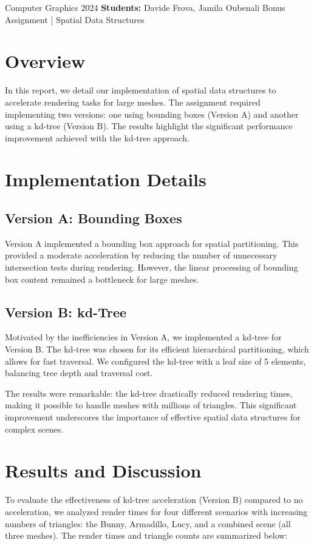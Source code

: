 \documentclass[unicode,11pt,a4paper,oneside,numbers=endperiod,openany]{scrartcl}
\begin{document}
\setassignment

\serieheader
{Computer Graphics}
{2024}
{\textbf{Students:} Davide Frova, Jamila Oubenali}
{}
{Bonus Assignment | Spatial Data Structures}{}

\section{Overview}
In this report, we detail our implementation of spatial data structures to accelerate rendering tasks for large meshes. The assignment required implementing two versions: one using bounding boxes (Version A) and another using a kd-tree (Version B). The results highlight the significant performance improvement achieved with the kd-tree approach.

\section{Implementation Details}

\subsection{Version A: Bounding Boxes}
Version A implemented a bounding box approach for spatial partitioning. This provided a moderate acceleration by reducing the number of unnecessary intersection tests during rendering. However, the linear processing of bounding box content remained a bottleneck for large meshes.

\subsection{Version B: kd-Tree}
Motivated by the inefficiencies in Version A, we implemented a kd-tree for Version B. The kd-tree was chosen for its efficient hierarchical partitioning, which allows for fast traversal. We configured the kd-tree with a leaf size of 5 elements, balancing tree depth and traversal cost.

The results were remarkable: the kd-tree drastically reduced rendering times, making it possible to handle meshes with millions of triangles. This significant improvement underscores the importance of effective spatial data structures for complex scenes.

\section{Results and Discussion}
To evaluate the effectiveness of kd-tree acceleration (Version B) compared to no acceleration, we analyzed render times for four different scenarios with increasing numbers of triangles: the Bunny, Armadillo, Lucy, and a combined scene (all three meshes). The render times and triangle counts are summarized below:
\end{document}
